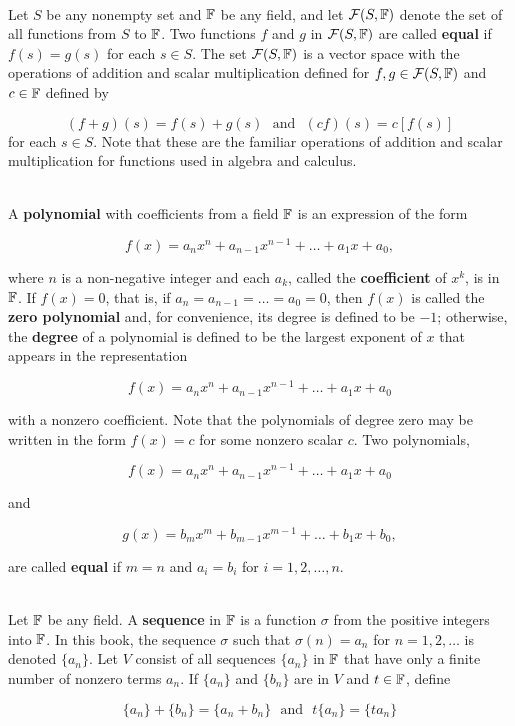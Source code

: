\begin{definition}\label{Definition 1.7}
	\hfill\\
	Let $S$ be any nonempty set and $\mathbb{F}$ be any field, and let $\mathcal{F}(S, \mathbb{F})$ denote the set of all functions from $S$ to $\mathbb{F}$. Two functions $f$ and $g$ in $\mathcal{F}(S, \mathbb{F})$ are called \textbf{equal} if $f(s) = g(s)$ for each $s \in S$. The set $\mathcal{F}(S, \mathbb{F})$ is a vector space with the operations of addition and scalar multiplication defined for $f,g \in \mathcal{F}(S, \mathbb{F})$ and $c \in \mathbb{F}$ defined by

	\[(f + g)(s) = f(s) + g(s)\ \ \ \text{and}\ \ \ (cf)(s) = c[f(s)]\]
	for each $s \in S$. Note that these are the familiar operations of addition and scalar multiplication for functions used in algebra and calculus.
\end{definition}

\begin{definition}
	\hfill\\
	A \textbf{polynomial} with coefficients from a field $\mathbb{F}$ is an expression of the form

	\[f(x)=a_nx^n + a_{n-1}x^{n-1}+\dots+a_1x+a_0,\]

	where $n$ is a non-negative integer and each $a_k$, called the \textbf{coefficient} of $x^k$, is in $\mathbb{F}$. If $f(x)=0$, that is, if $a_n = a_{n-1} = \dots = a_0 = 0$, then $f(x)$ is called the \textbf{zero polynomial} and, for convenience, its degree is defined to be $-1$; otherwise, the \textbf{degree} of a polynomial is defined to be the largest exponent of $x$ that appears in the representation

	\[f(x)=a_nx^n + a_{n-1}x^{n-1}+\dots+a_1x+a_0\]

	with a nonzero coefficient. Note that the polynomials of degree zero may be written in the form $f(x) = c$ for some nonzero scalar $c$. Two polynomials,

	\[f(x)=a_nx^n + a_{n-1}x^{n-1}+\dots+a_1x+a_0\]

	and

	\[g(x)=b_mx^m + b_{m-1}x^{m-1}+\dots+b_1x+b_0,\]

	are called \textbf{equal} if $m=n$ and $a_i = b_i$ for $i=1, 2, \dots, n$.
\end{definition}

\begin{definition}
	\hfill\\
	Let $\mathbb{F}$ be any field. A \textbf{sequence} in $\mathbb{F}$ is a function $\sigma$ from the positive integers into $\mathbb{F}$. In this book, the sequence $\sigma$ such that $\sigma(n) = a_n$ for $n=1, 2, \dots$ is denoted $\{a_n\}$. Let $V$ consist of all sequences $\{a_n\}$ in $\mathbb{F}$ that have only a finite number of nonzero terms $a_n$. If $\{a_n\}$ and $\{b_n\}$ are in $V$ and $t \in \mathbb{F}$, define

	\[\{a_n\} + \{b_n\} = \{a_n + b_n\}\ \ \ \text{and}\ \ \ t\{a_n\} = \{ta_n\}\]
\end{definition}

